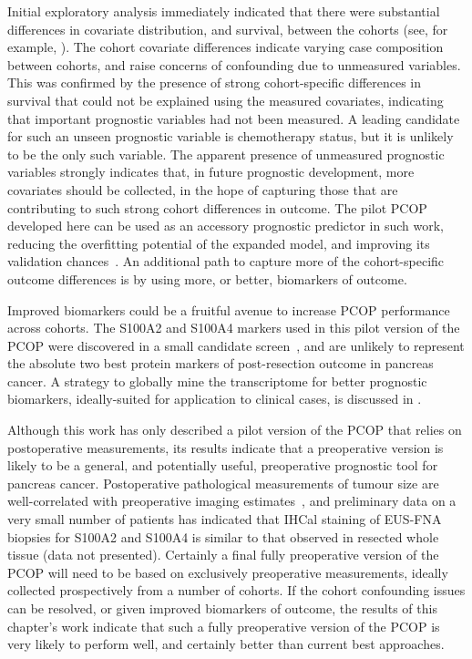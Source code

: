 \documentclass[dissertation.tex]{subfiles}
\begin{document}
Initial exploratory analysis immediately indicated that there were substantial differences in covariate distribution, and survival, between the cohorts (see, for example, ).  The cohort covariate differences indicate varying case composition between cohorts, and raise concerns of confounding due to unmeasured variables.  This was confirmed by the presence of strong cohort-specific differences in survival that could not be explained using the measured covariates, indicating that important prognostic variables had not been measured.  A leading candidate for such an unseen prognostic variable is chemotherapy status, but it is unlikely to be the only such variable.  The apparent presence of unmeasured prognostic variables strongly indicates that, in future prognostic development, more covariates should be collected, in the hope of capturing those that are contributing to such strong cohort differences in outcome.  The pilot \gls{PCOP} developed here can be used as an accessory prognostic predictor in such work, reducing the overfitting potential of the expanded model, and improving its validation chances~\cite{VanHouwelingen2000}.  An additional path to capture more of the cohort-specific outcome differences is by using more, or better, biomarkers of outcome.

Improved biomarkers could be a fruitful avenue to increase \gls{PCOP} performance across cohorts.  The S100A2 and S100A4 markers used in this pilot version of the \gls{PCOP} were discovered in a small candidate screen~\cite{Biankin2009, Biankin2009b}, and are unlikely to represent the absolute two best protein markers of post-resection outcome in pancreas cancer.  A strategy to globally mine the transcriptome for better prognostic biomarkers, ideally-suited for application to clinical cases, is discussed in .

Although this work has only described a pilot version of the \gls{PCOP} that relies on postoperative measurements, its results indicate that a preoperative version is likely to be a general, and potentially useful, preoperative prognostic tool for pancreas cancer.  Postoperative pathological measurements of tumour size are well-correlated with preoperative imaging estimates~\cite{Arvold2011}, and preliminary data on a very small number of patients has indicated that \gls{IHCal} staining of \gls{EUS}-\gls{FNA} biopsies for S100A2 and S100A4 is similar to that observed in resected whole tissue (data not presented).  Certainly a final fully preoperative version of the \gls{PCOP} will need to be based on exclusively preoperative measurements, ideally collected prospectively from a number of cohorts.  If the cohort confounding issues can be resolved, or given improved biomarkers of outcome, the results of this chapter's work indicate that such a fully preoperative version of the \gls{PCOP} is very likely to perform well, and certainly better than current best approaches.
\end{document}
